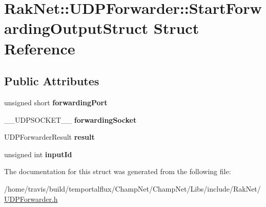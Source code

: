 \hypertarget{struct_rak_net_1_1_u_d_p_forwarder_1_1_start_forwarding_output_struct}{\section{Rak\-Net\-:\-:U\-D\-P\-Forwarder\-:\-:Start\-Forwarding\-Output\-Struct Struct Reference}
\label{struct_rak_net_1_1_u_d_p_forwarder_1_1_start_forwarding_output_struct}
}
\subsection*{Public Attributes}
\begin{DoxyCompactItemize}
\item 
\hypertarget{struct_rak_net_1_1_u_d_p_forwarder_1_1_start_forwarding_output_struct_affde158e3843548da6c1f4b74550a37d}{unsigned short {\bfseries forwarding\-Port}}\label{struct_rak_net_1_1_u_d_p_forwarder_1_1_start_forwarding_output_struct_affde158e3843548da6c1f4b74550a37d}

\item 
\hypertarget{struct_rak_net_1_1_u_d_p_forwarder_1_1_start_forwarding_output_struct_ab47d4e2ce6d397eab6e9f7602d0f5a8a}{\-\_\-\-\_\-\-U\-D\-P\-S\-O\-C\-K\-E\-T\-\_\-\-\_\- {\bfseries forwarding\-Socket}}\label{struct_rak_net_1_1_u_d_p_forwarder_1_1_start_forwarding_output_struct_ab47d4e2ce6d397eab6e9f7602d0f5a8a}

\item 
\hypertarget{struct_rak_net_1_1_u_d_p_forwarder_1_1_start_forwarding_output_struct_a862985f73863d607aa331e9186631762}{U\-D\-P\-Forwarder\-Result {\bfseries result}}\label{struct_rak_net_1_1_u_d_p_forwarder_1_1_start_forwarding_output_struct_a862985f73863d607aa331e9186631762}

\item 
\hypertarget{struct_rak_net_1_1_u_d_p_forwarder_1_1_start_forwarding_output_struct_a0b99e03eb2cf89ca0aa9b3b8eeca0935}{unsigned int {\bfseries input\-Id}}\label{struct_rak_net_1_1_u_d_p_forwarder_1_1_start_forwarding_output_struct_a0b99e03eb2cf89ca0aa9b3b8eeca0935}

\end{DoxyCompactItemize}


The documentation for this struct was generated from the following file\-:\begin{DoxyCompactItemize}
\item 
/home/travis/build/temportalflux/\-Champ\-Net/\-Champ\-Net/\-Libs/include/\-Rak\-Net/\hyperlink{_u_d_p_forwarder_8h}{U\-D\-P\-Forwarder.\-h}\end{DoxyCompactItemize}

